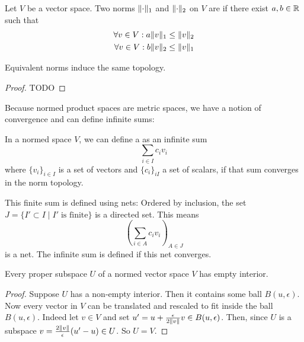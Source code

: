 \begin{definition}
Let $V$ be a vector space. Two norms $\lVert\cdot\rVert_1$ and $\lVert\cdot\rVert_2$ on $V$ are  if there exist $a,b\in \mathbb{R}$ such that
\begin{align*}
\forall v\in V: a\lVert v\rVert_1&\leq \lVert v\rVert_2 \\
\forall v\in V: b\lVert v\rVert_2&\leq \lVert v\rVert_1
\end{align*}
\end{definition}

\begin{proposition}
Equivalent norms induce the same topology.
\end{proposition}
\begin{proof}
TODO
\end{proof}

Because normed product spaces are metric spaces, we have a notion of convergence and can define infinite sums:
\begin{definition}
In a normed space $V$, we can define a  as an infinite sum
\[ \sum_{i\in I} c_i v_i  \]
where $\{v_i\}_{i\in I}$ is a set of vectors and $\{c_i\}_{i I}$ a set of scalars, if that sum converges in the norm topology.
\end{definition}
\begin{note}
This finite sum is defined using nets:
Ordered by inclusion, the set $J = \{I'\subset I \;|\; I' \; \text{is finite}\}$ is a directed set. This means
\[ \left(\sum_{i\in A}c_iv_i \right)_{A\in J} \]
is a net. The infinite sum is defined if this net converges.
\end{note}

\begin{lemma}
Every proper subspace $U$ of a normed vector space $V$ has empty interior.
\end{lemma}
\begin{proof}
Suppose $U$ has a non-empty interior. Then it contains some ball $B(u,\epsilon)$. Now every vector in $V$ can be translated and rescaled to fit inside the ball $B(u,\epsilon)$. Indeed let $v\in V$ and set $u' = u+ \frac{\epsilon}{2\lVert v\rVert}v \in B(u,\epsilon)$. Then, since $U$ is a subspace $v = \frac{2\lVert v\rVert}{\epsilon}(u'-u)\in U$. So $U=V$.
\end{proof}

